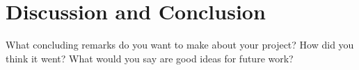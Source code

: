 \chapter{Discussion and Conclusion}
\label{chap:conclusion}
\onehalfspacing

What concluding remarks do you want to make about your project? How did you think it went? What would you say are good ideas for future work?